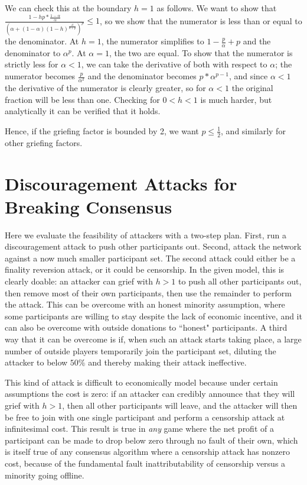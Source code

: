 \documentclass[12pt]{article}
\begin{document}
We can check this at the boundary $h = 1$ as follows. We want to show that $\frac{1 - hp * \frac{1-\alpha}{\alpha}}{(\alpha + (1-\alpha)(1-h)^{\frac{d}{d+p}})^p} \le 1$, so we show that the numerator is less than or equal to the denominator. At $h = 1$, the numerator simplifies to $1 - \frac{p}{\alpha} + p$ and the denominator to $\alpha^p$. At $\alpha=1$, the two are equal. To show that the numerator is strictly less for $\alpha<1$, we can take the derivative of both with respect to $\alpha$; the numerator becomes $\frac{p}{\alpha^2}$ and the denominator becomes $p * \alpha^{p-1}$, and since $\alpha < 1$ the derivative of the numerator is clearly greater, so for $\alpha < 1$ the original fraction will be less than one. Checking for $0 < h < 1$ is much harder, but analytically it can be verified that it holds.

Hence, if the griefing factor is bounded by 2, we want $p \le \frac{1}{2}$, and similarly for other griefing factors.


\section{Discouragement Attacks for Breaking Consensus}

Here we evaluate the feasibility of attackers with a two-step plan. First, run a discouragement attack to push other participants out. Second, attack the network against a now much smaller participant set. The second attack could either be a finality reversion attack, or it could be censorship. In the given model, this is clearly doable: an attacker can grief with $h > 1$ to push all other participants out, then remove most of their own participants, then use the remainder to perform the attack. This can be overcome with an honest minority assumption, where some participants are willing to stay despite the lack of economic incentive, and it can also be overcome with outside donations to ``honest" participants. A third way that it can be overcome is if, when such an attack starts taking place, a large number of outside players temporarily join the participant set, diluting the attacker to below $50\%$ and thereby making their attack ineffective.

This kind of attack is difficult to economically model because under certain assumptions the cost is zero: if an attacker can credibly announce that they will grief with $h > 1$, then all other participants will leave, and the attacker will then be free to join with one single participant and perform a censorship attack at infinitesimal cost. This result is true in \textit{any} game where the net profit of a participant can be made to drop below zero through no fault of their own, which is itself true of any consensus algorithm where a censorship attack has nonzero cost, because of the fundamental fault inattributability of censorship versus a minority going offline.
\end{document}

